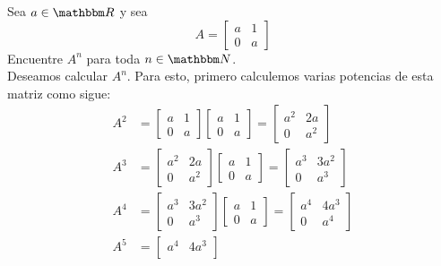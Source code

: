 \begin{example}
    Sea $a \in \RR$ y sea
    $$A = \begin{bmatrix}
        a & 1 \\
        0 & a
    \end{bmatrix}$$
    Encuentre $A^n$ para toda $n \in \NN$. \\
    \solucion Deseamos calcular $A^n$. Para esto, primero calculemos varias potencias de esta matriz como sigue:
    \begin{align*}
        A^2 & = \begin{bmatrix}
            a & 1 \\
            0 & a
        \end{bmatrix} \begin{bmatrix}
            a & 1 \\
            0 & a
        \end{bmatrix} = \begin{bmatrix}
            a^2 & 2a \\
            0 & a^2
        \end{bmatrix} \\
        A^3 & = \begin{bmatrix}
            a^2 & 2a \\
            0 & a^2
        \end{bmatrix} \begin{bmatrix}
            a & 1 \\
            0 & a
        \end{bmatrix} = \begin{bmatrix}
            a^3 & 3a^2 \\
            0 & a^3
        \end{bmatrix} \\
        A^4 & = \begin{bmatrix}
            a^3 & 3a^2 \\
            0 & a^3
        \end{bmatrix} \begin{bmatrix}
            a & 1 \\
            0 & a
        \end{bmatrix} = \begin{bmatrix}
            a^4 & 4a^3 \\
            0 & a^4
        \end{bmatrix} \\
        A^5 & = \begin{bmatrix}
            a^4 & 4a^3 \\

\end{bmatrix}
\end{align*}
\end{example}
